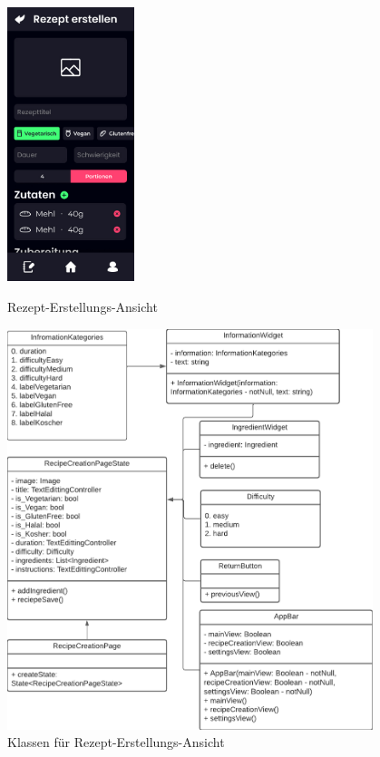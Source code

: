 \documentclass{entwurfsheft}
\begin{document}
\begin{figure}[htp]
    \begin{minipage}
        [t]{0.49\textwidth}
        \centering
        \includegraphics[height=80mm]{images/Presentation-layer/RecipeCreationView.jpg}
        \caption{Rezept-Erstellungs-Ansicht}
    \end{minipage}
    \begin{minipage}
        [t]{0.49\textwidth}
        \centering
        \includegraphics[width=0.95\textwidth]{images/Presentation-layer/RecipeCreationViewClass.pdf}
        \caption{Klassen für Rezept-Erstellungs-Ansicht}
    \end{minipage}
\end{figure}
\end{document}

